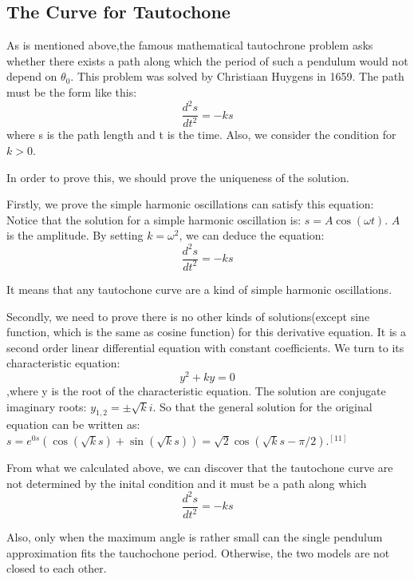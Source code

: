 \documentclass{article}
\begin{document}
\subsection{The Curve for Tautochone}
\par As is mentioned above,the famous mathematical tautochrone problem asks whether there exists a path along which the 
period of such a pendulum would not depend on $\theta_0$. This problem was 
solved by Christiaan Huygens in 1659. The path must be the form like this:
\begin{equation*}
\frac{d^{2}s}{dt^{2}}=  -ks
\end{equation*}
where s is the path length and t is the time. Also, we consider the condition for $k>0$.
\par In order to prove this, we should prove the uniqueness of the solution.
\par Firstly, we prove the simple harmonic oscillations can satisfy this equation: Notice that the solution for a simple harmonic oscillation is:  $s=A \cos(\omega t)$. $A$ is the amplitude. By setting $k = \omega^{2}$, we can deduce the equation: 
\begin{equation*}
\frac{d^{2}s}{dt^{2}}=  -ks
\end{equation*}
\par It means that any tautochone curve are a kind of simple harmonic oscillations.
\par Secondly, we need to prove there is no other kinds of solutions(except sine function, which is the same as cosine function) for this derivative equation. It is a second order linear differential equation with constant coefficients. We turn to its characteristic equation:  
\begin{equation*}
y^{2} + ky =0
\end{equation*}
,where y is the root of the characteristic equation. The solution are conjugate imaginary roots: $y_{1,2} = \pm\sqrt{k}i$. So that the general solution for the original equation can be written as: $s = e^{0s}(\cos(\sqrt{k}s) + \sin(\sqrt{k}s))= \sqrt{2}\cos(\sqrt{k}s - \pi/2 )$.$^{[11]}$
\par From what we calculated above, we can discover that the tautochone curve are not determined by the inital condition and it must be a path along which
 \begin{equation*}
\frac{d^{2}s}{dt^{2}}=  -ks
\end{equation*}
\par Also, only when the maximum angle is rather small can the single pendulum  approximation fits the tauchochone period. Otherwise, the two models are not closed to each other. 
\end{document}
